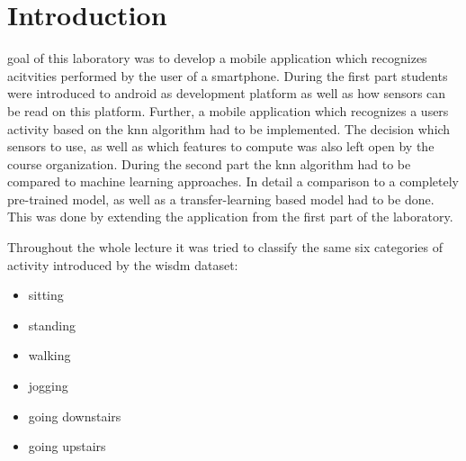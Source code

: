 \section{Introduction}
\label{sec:intro}
 goal of this laboratory was to develop a mobile application which recognizes acitvities performed by the user of a smartphone. During the first part students were introduced to android as development platform as well as how sensors can be read on this platform. Further, a mobile application which recognizes a users activity based on the \gls{knn} algorithm had to be implemented. The decision which sensors to use, as well as which features to compute was also left open by the course organization. During the second part the \gls{knn} algorithm had to be compared to machine learning approaches. In detail a comparison to a completely pre-trained model, as well as a transfer-learning based model had to be done. This was done by extending the application from the first part of the laboratory.

Throughout the whole lecture it was tried to classify the same six categories of activity introduced by the \gls{wisdm} dataset\autocite{wisdm:dataset}:
\begin{itemize}
\item sitting
\item standing
\item walking
\item jogging
\item going downstairs
\item going upstairs
\end{itemize}